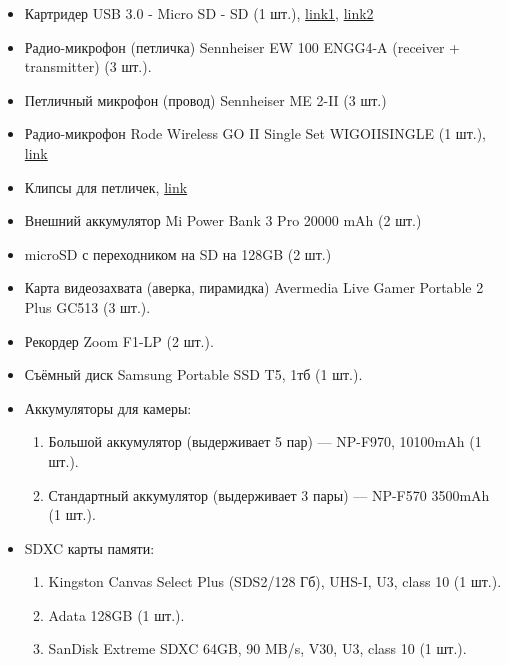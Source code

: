 \begin{itemize}[noitemsep]
  \item Картридер USB 3.0 - Micro SD - SD (1 шт.), \href{https://www.ozon.ru/product/kartrider-usb-3-0-micro-sd-sd-perehodnik-dlya-fleshkart-2-v-1-1617100018/}{link1}, \href{https://www.ozon.ru/product/kartrider-usb3-0-sd-microsd-tf-sdhc-sdxc-chernyy-5bites-re3-200bk-806714264/}{link2}
  \item Радио-микрофон (петличка) {\small\textsf{Sennheiser EW 100 ENGG4-A (receiver + transmitter)}} (3 шт.).
  \item Петличный микрофон (провод) \textsf{Sennheiser ME 2-II} (3 шт.)
  \item Радио-микрофон \textsf{Rode Wireless GO II Single Set WIGOIISINGLE} (1 шт.), \href{https://tehnozum.ru/catalog/komplekt-mikrofonov-rode-wireless-go-ii-single-set-wigoiisingle/}{link}
  \item Клипсы для петличек, \href{https://pixel24.ru/catalog/view/id/47095}{link}
  \item Внешний аккумулятор \textsf{Mi Power Bank 3 Pro 20000 mAh} (2 шт.)
  \item microSD с переходником на SD на 128GB (2 шт.)
  \item Карта видеозахвата (аверка, пирамидка) \textsf{Avermedia Live Gamer Portable 2 Plus GC513} (3 шт.).
  \item Рекордер \textsf{Zoom F1-LP} (2 шт.).
  \item Съёмный диск \textsf{Samsung Portable SSD T5}, 1тб (1 шт.).

  \item Аккумуляторы для камеры:
        \begin{enumerate}
          \item Большой аккумулятор (выдерживает 5 пар) --- \textsf{NP-F970, 10100mAh} (1 шт.).
          \item Стандартный аккумулятор (выдерживает 3 пары) --- \textsf{NP-F570 3500mAh} (1 шт.).
        \end{enumerate}\vspace{0.4\baselineskip}

  \item \textsf{SDXC} карты памяти:
        \begin{enumerate}
          \item \textsf{Kingston Canvas Select Plus (SDS2/128 Гб), UHS-I, U3, class 10} (1 шт.).
          \item \textsf{Adata 128GB} (1 шт.).
          \item \textsf{SanDisk Extreme SDXC 64GB, 90 MB/s, V30, U3, class 10} (1 шт.).
        \end{enumerate}\vspace{0.4\baselineskip}


\end{itemize}
